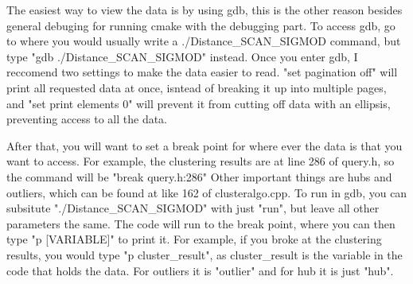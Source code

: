 \documentclass{article}
\begin{document}
The easiest way to view the data is by using gdb, this is the other reason besides general debuging for running cmake with the debugging part.  To access gdb, go to where you would usually write a ./Distance\_SCAN\_SIGMOD command, but type "gdb ./Distance\_SCAN\_SIGMOD" instead.  Once you enter gdb, I reccomend two settings to make the data easier to read.  "set pagination off" will print all requested data at once, isntead of breaking it up into multiple pages, and "set print elements 0" will prevent it from cutting off data with an ellipsis, preventing access to all the data.

After that, you will want to set a break point for where ever the data is that you want to access. For example, the clustering results are at line 286 of query.h, so the command will be "break query.h:286" Other important things are hubs and outliers, which can be found at like 162 of clusteralgo.cpp.  To run in gdb, you can subsitute "./Distance\_SCAN\_SIGMOD" with just "run", but leave all other parameters the same.  The code will run to the break point, where you can then type "p [VARIABLE]" to print it.  For example, if you broke at the clustering results, you would type "p cluster\_result", as cluster\_result is the variable in the code that holds the data.  For outliers it is "outlier" and for hub it is just "hub".
\end{document}
